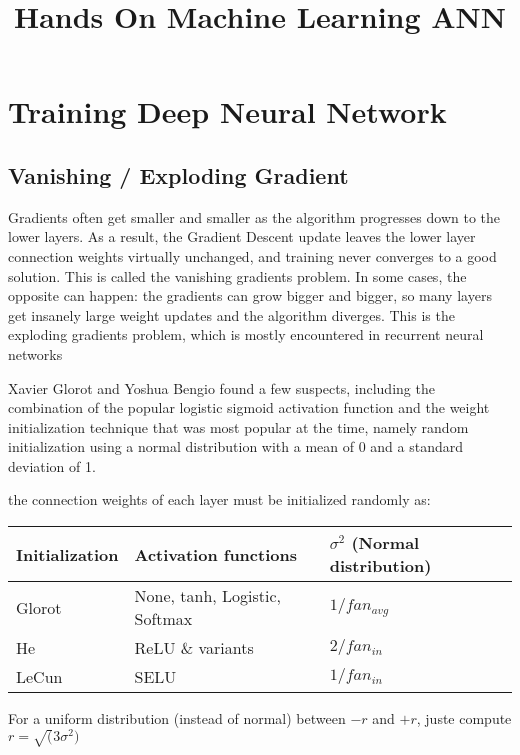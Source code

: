 \documentclass[french]{article}
\title{Hands On Machine Learning ANN}
\begin{document}
\date{}

\maketitle

\section{Training Deep Neural Network}

\subsection{Vanishing / Exploding Gradient}

Gradients often get smaller and smaller as the algorithm progresses down to the lower layers. As a result, the Gradient Descent update leaves the lower layer connection weights virtually unchanged, and training never converges to a good solution. This is called the vanishing gradients problem. In some cases, the opposite can happen: the gradients can grow bigger and bigger, so many layers get insanely large weight updates and the algorithm diverges. This is the exploding gradients problem, which is mostly encountered in recurrent neural networks

Xavier Glorot and Yoshua Bengio found a few suspects, including the combination of the popular logistic sigmoid activation function and the weight initialization technique that was most popular at the time, namely random initialization using a normal distribution with a mean of 0 and a standard deviation of 1. 

the connection weights of each layer must be initialized randomly as: \\

\begin{tabular}{@{}lll@{}}
    \toprule
    Initialization & Activation functions & $\sigma^2$ (Normal distribution) \\
    \hline
    Glorot & None, tanh, Logistic, Softmax & $1/fan_{avg}$ \\
    He & ReLU \& variants & $2/fan_{in}$ \\
    LeCun & SELU & $1/fan_{in}$ \\
    \bottomrule
\end{tabular}
$ $ \\

For a uniform distribution (instead of normal) between $-r$ and $+r$, juste compute $r = \sqrt(3 \sigma^2)$
\end{document}
